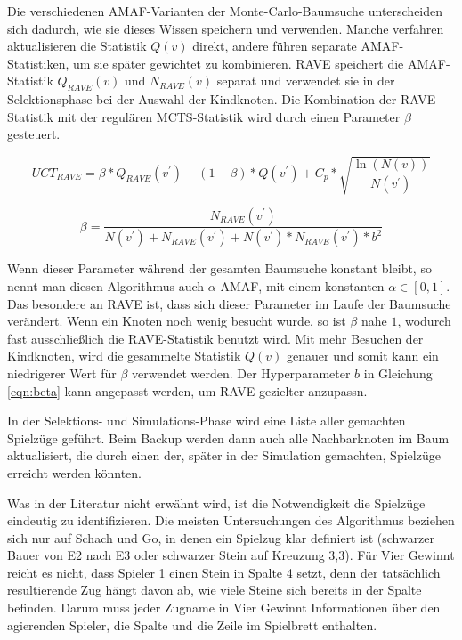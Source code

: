 Die verschiedenen AMAF-Varianten der Monte-Carlo-Baumsuche unterscheiden sich dadurch, wie sie dieses Wissen speichern und verwenden. Manche verfahren aktualisieren die Statistik $Q(v)$ direkt, andere führen separate AMAF-Statistiken, um sie später gewichtet zu kombinieren. RAVE speichert die AMAF-Statistik $Q_{RAVE}(v)$ und $N_{RAVE}(v)$ separat und verwendet sie in der Selektionsphase bei der Auswahl der Kindknoten. Die Kombination der RAVE-Statistik mit der regulären MCTS-Statistik wird durch einen Parameter $\beta$ gesteuert.

\medskip
\begin{equation}
UCT_{RAVE}=\beta * Q_{RAVE}(v^\prime) + (1-\beta) * Q(v^\prime) + C_p * \sqrt{\frac{\ln(N(v))}{N(v^\prime)}}
\label{eqn:uct-rave}
\end{equation}

\begin{equation}
\beta = \frac{N_{RAVE}(v^\prime)}{N(v^\prime)+N_{RAVE}(v^\prime)+N(v^\prime)*N_{RAVE}(v^\prime)*b^2}
\label{eqn:beta}
\end{equation}


\medskip
Wenn dieser Parameter während der gesamten Baumsuche konstant bleibt, so nennt man diesen Algorithmus auch $\alpha$-AMAF, mit einem konstanten $\alpha \in [0,1]$. Das besondere an RAVE ist, dass sich dieser Parameter im Laufe der Baumsuche verändert. Wenn ein Knoten noch wenig besucht wurde, so ist $\beta$ nahe $1$, wodurch fast ausschließlich die RAVE-Statistik benutzt wird. Mit mehr Besuchen der Kindknoten, wird die gesammelte Statistik $Q(v)$ genauer und somit kann ein niedrigerer Wert für $\beta$ verwendet werden. Der Hyperparameter $b$ in Gleichung \ref{eqn:beta} kann angepasst werden, um RAVE gezielter anzupassn.

In der Selektions- und Simulations-Phase wird eine Liste aller gemachten Spielzüge geführt. Beim Backup werden dann auch alle Nachbarknoten im Baum aktualisiert, die durch einen der, später in der Simulation gemachten, Spielzüge erreicht werden könnten.

Was in der Literatur nicht erwähnt wird, ist die Notwendigkeit die Spielzüge eindeutig zu identifizieren. Die meisten Untersuchungen des Algorithmus beziehen sich nur auf Schach und Go, in denen ein Spielzug klar definiert ist (schwarzer Bauer von E2 nach E3 oder schwarzer Stein auf Kreuzung 3,3).
Für Vier Gewinnt reicht es nicht, dass Spieler 1 einen Stein in Spalte 4 setzt, denn der tatsächlich resultierende Zug hängt davon ab, wie viele Steine sich bereits in der Spalte befinden. Darum muss jeder Zugname in Vier Gewinnt Informationen über den agierenden Spieler, die Spalte und die Zeile im Spielbrett enthalten.

